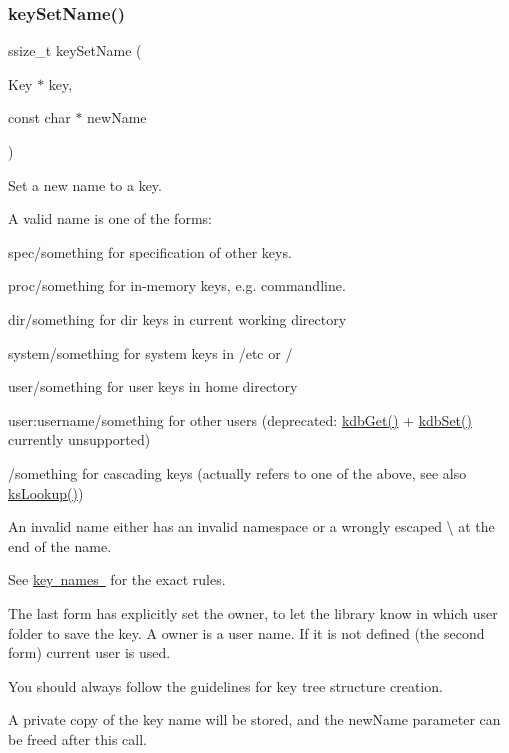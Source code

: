 \subsubsection{\texorpdfstring{keySetName()}{keySetName()}}
{\footnotesize\ttfamily ssize\+\_\+t key\+Set\+Name (\begin{DoxyParamCaption}\item[{Key $\ast$}]{key,  }\item[{const char $\ast$}]{new\+Name }\end{DoxyParamCaption})}



Set a new name to a key. 

A valid name is one of the forms\+:
\begin{DoxyItemize}
\item {\ttfamily spec/something} for specification of other keys.
\item {\ttfamily proc/something} for in-\/memory keys, e.\+g. commandline.
\item {\ttfamily dir/something} for dir keys in current working directory
\item {\ttfamily system/something} for system keys in /etc or /
\item {\ttfamily user/something} for user keys in home directory
\item {\ttfamily user\+:username/something} for other users (deprecated\+: \mbox{\hyperlink{group__kdb_ga28e385fd9cb7ccfe0b2f1ed2f62453a1}{kdb\+Get()}} + \mbox{\hyperlink{group__kdb_ga11436b058408f83d303ca5e996832bcf}{kdb\+Set()}} currently unsupported)
\item {\ttfamily /something} for cascading keys (actually refers to one of the above, see also \mbox{\hyperlink{group__keyset_gaa34fc43a081e6b01e4120daa6c112004}{ks\+Lookup()}})
\end{DoxyItemize}

An invalid name either has an invalid namespace or a wrongly escaped \textbackslash{} at the end of the name.

See \mbox{\hyperlink{group__keyname}{key names }} for the exact rules.

The last form has explicitly set the owner, to let the library know in which user folder to save the key. A owner is a user name. If it is not defined (the second form) current user is used.

You should always follow the guidelines for key tree structure creation.

A private copy of the key name will be stored, and the {\ttfamily new\+Name} parameter can be freed after this call.

